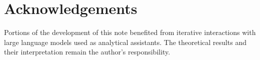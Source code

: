\documentclass[11pt]{article}
\begin{document}
\section*{Acknowledgements}
Portions of the development of this note benefited from iterative interactions with large language models
used as analytical assistants.
The theoretical results and their interpretation remain the author's responsibility.

\clearpage


\end{document}
